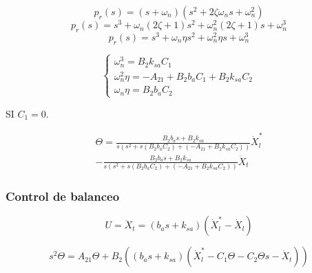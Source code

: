\documentclass{article}
\begin{document}
            \begin{equation}
                p_r(s)=(s+\omega_n)(s^2+2\zeta\omega_n s+\omega_n^2)
            \end{equation}
            \begin{equation}
                p_r(s)=s^3+\omega_n(2\zeta+1)s^2+\omega_n^2(2\zeta+1)s +\omega_n^3
            \end{equation}
            \begin{equation}
                p_r(s)=s^3+\omega_n \eta s^2+\omega_n^2 \eta s +\omega_n^3
            \end{equation}

            \begin{equation}
                \begin{cases}
                    \omega_n^3 = B_{2}k_{sa} C_1 \\
                    \omega_n^2 \eta = -A_{21} +B_{2}b_a C_1 +B_{2}k_{sa} C_2 \\
                    \omega_n \eta  = B_{2}b_a C_2 
                \end{cases}
            \end{equation}

            SI \(C_1=0\).

            \begin{equation}
                \begin{split}
                    \Theta= \frac{B_{2}b_a s + B_{2}k_{sa}}{s\left(s^2 + s \left(B_{2}b_a C_2\right) + \left(-A_{21} +B_{2}k_{sa} C_2 \right)\right)} \dot{X}_l^*\\
                    - \frac{B_{2}b_a s+B_{2}k_{sa}}{s\left(s^2 + s \left(B_{2}b_a C_2\right) + \left(-A_{21} +B_{2}k_{sa} C_2 \right)\right)} \dot{X}_t
                \end{split}
            \end{equation}

        \subsubsection{Control de balanceo}
            \begin{equation}
                U=\ddot{X}_t= \left(b_a s+k_{sa}\right) \left(\dot{X}_l^*- \dot{X}_l\right)
            \end{equation}
            
            \begin{equation}
                s^2 \Theta = A_{21} \Theta + B_{2} \left( \left(b_a s+k_{sa}\right) \left(\dot{X}_l^*- C_1 \Theta-C_2 \Theta s - \dot{X}_t\right) \right)
            \end{equation}
\end{document}
